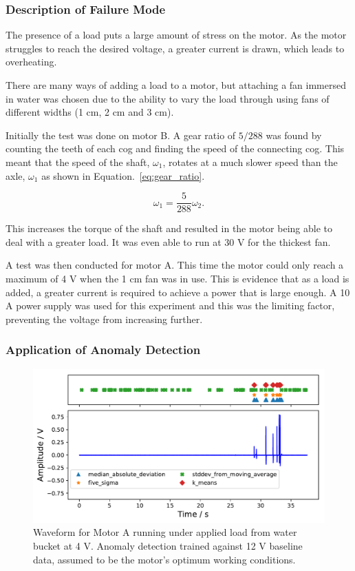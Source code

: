 \subsubsection{Description of Failure Mode}
The presence of a load puts a large amount of stress on the motor. As the motor struggles to reach the desired voltage, a greater current is drawn, which leads to overheating.
        
There are many ways of adding a load to a motor, but attaching a fan immersed in water was chosen due to the ability to vary the load through using fans of different widths (1 cm, 2 cm and 3 cm).
    
Initially the test was done on motor B. A gear ratio of ${5}/{288}$ was found by counting the teeth of each cog and finding the speed of the connecting cog. This meant that the speed of the shaft, $\omega_1$, rotates at a much slower speed than the axle, $\omega _1$ as shown in Equation.~\eqref{eq:gear_ratio}.

\begin{equation}
\omega_1 = \frac{5}{288} \omega_2.
\label{eq:gear_ratio}
\end{equation}

This increases the torque of the shaft and resulted in the motor being able to deal with a greater load. It was even able to run at 30 V for the thickest fan.

A test was then conducted for motor A. This time the motor could only reach a maximum of 4 V when the 1 cm fan was in use. This is evidence that as a load is added, a greater current is required to achieve a power that is large enough. A 10 A power supply was used for this experiment and this was the limiting factor, preventing the voltage from increasing further.

\subsubsection{Application of Anomaly Detection}

\begin{figure}[t]
    \includegraphics[width=1.0\textwidth]{fig/large_4V-9A_water_large_12V.pdf}
    \caption[Anomaly Plot Large Motor under Load]{Waveform for Motor A running under applied load from water bucket at 4 V. Anomaly detection trained against 12 V baseline data, assumed to be the motor's optimum working conditions.}
    \label{fig:largemotor_water4V}
\end{figure}

